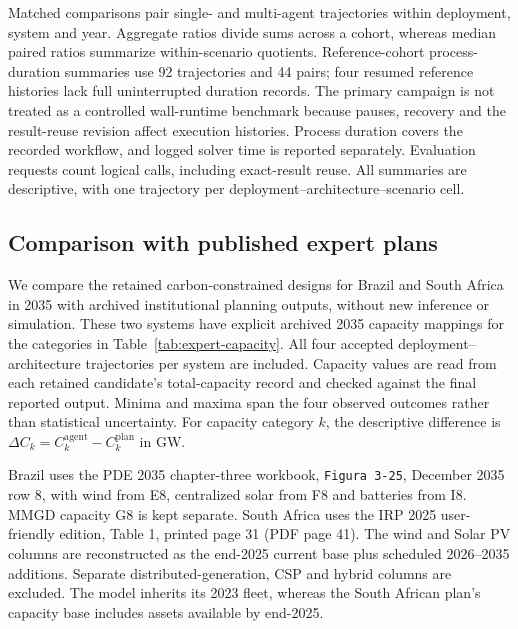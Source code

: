 \documentclass[pdflatex,sn-nature]{sn-jnl}
\begin{document}
Matched comparisons pair single- and multi-agent trajectories within deployment, system and year. Aggregate ratios divide sums across a cohort, whereas median paired ratios summarize within-scenario quotients. Reference-cohort process-duration summaries use 92 trajectories and 44 pairs; four resumed reference histories lack full uninterrupted duration records. The primary campaign is not treated as a controlled wall-runtime benchmark because pauses, recovery and the result-reuse revision affect execution histories. Process duration covers the recorded workflow, and logged solver time is reported separately. Evaluation requests count logical calls, including exact-result reuse. All summaries are descriptive, with one trajectory per deployment--architecture--scenario cell.

\subsection{Comparison with published expert plans}\label{sec:expert-methods}

We compare the retained carbon-constrained designs for Brazil and South Africa in 2035 with archived institutional planning outputs, without new inference or simulation. These two systems have explicit archived 2035 capacity mappings for the categories in Table~\ref{tab:expert-capacity}. All four accepted deployment--architecture trajectories per system are included. Capacity values are read from each retained candidate's total-capacity record and checked against the final reported output. Minima and maxima span the four observed outcomes rather than statistical uncertainty. For capacity category $k$, the descriptive difference is $\Delta C_k=C^{\mathrm{agent}}_k-C^{\mathrm{plan}}_k$ in GW.

Brazil uses the PDE 2035 chapter-three workbook, \texttt{Figura 3-25}, December 2035 row 8, with wind from E8, centralized solar from F8 and batteries from I8. MMGD capacity G8 is kept separate. South Africa uses the IRP 2025 user-friendly edition, Table 1, printed page 31 (PDF page 41). The wind and Solar PV columns are reconstructed as the end-2025 current base plus scheduled 2026--2035 additions. Separate distributed-generation, CSP and hybrid columns are excluded. The model inherits its 2023 fleet, whereas the South African plan's capacity base includes assets available by end-2025.
\end{document}
